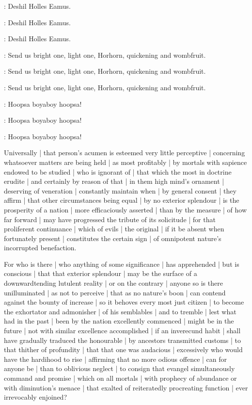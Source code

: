 \pagebreak


:
Deshil Holles Eamus.

:
Deshil Holles Eamus.

:
Deshil Holles Eamus.

:
Send us bright one,
light one,
Horhorn,
quickening and wombfruit.

:
Send us bright one,
light one,
Horhorn,
quickening and wombfruit.

:
Send us bright one,
light one,
Horhorn,
quickening and wombfruit.

\Nurses:
Hoopsa boyaboy hoopsa!

\Nurses:
Hoopsa boyaboy hoopsa!

\Nurses:
Hoopsa boyaboy hoopsa!


Universally |
that person's acumen is esteemed very little perceptive |
concerning whatsoever matters are being held |
as most profitably |
by mortals with sapience endowed to be studied |
who is ignorant of |
that which the most in doctrine erudite |
and certainly by reason of that |
in them high mind's ornament |
deserving of veneration |
constantly maintain when |
by general consent |
they affirm |
that other circumstances being equal |
by no exterior splendour |
is the prosperity of a nation |
more efficaciously asserted |
than by the measure |
of how far forward |
may have progressed the tribute of its solicitude |
for that proliferent continuance |
which of evils |
the original |
if it be absent when fortunately present |
constitutes the certain sign |
of omnipotent nature's incorrupted benefaction.

For who is there |
who anything of some significance |
has apprehended |
but is conscious |
that that exterior splendour |
may be the surface of a downwardtending lutulent reality |
or on the contrary |
anyone so is there unilluminated |
as not to perceive |
that as no nature's boon |
can contend against the bounty of increase |
so it behoves every most just citizen |
to become the exhortator and admonisher |
of his semblables |
and to tremble |
lest what had in the past |
been by the nation excellently commenced |
might be in the future |
not with similar excellence accomplished |
if an inverecund habit |
shall have gradually traduced the honourable |
by ancestors transmitted customs |
to that thither of profundity |
that that one was audacious |
excessively who would have the hardihood to rise |
affirming that no more odious offence |
can for anyone be |
than to oblivious neglect |
to consign that evangel simultaneously command and promise |
which on all mortals |
with prophecy of abundance or with diminution's menace |
that exalted of reiteratedly procreating function |
ever irrevocably enjoined?

